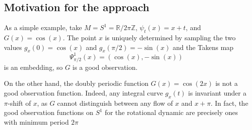 \documentclass[11pt]{article}
\theoremstyle{definition}
\theoremstyle{remark}
\newcommand{\RR}{\mathbb{R}}
\newcommand{\ZZ}{\mathbb{Z}}
\begin{document}
    \subsection{Motivation for the approach}
    As a simple example, take $M=S^1 = \RR/2\pi\ZZ$, $\psi_t(x) = x+t$, and $G(x) = \cos(x)$. The point $x$ is uniquely determined by sampling the two values $g_x(0)=\cos(x)$ and $g_x(\pi/2)= -\sin(x)$ and the Takens map
    \[\Psi_{\pi/2}^1(x) = (\cos(x), -\sin(x)) \]
    is an embedding, so $G$ is a good observation.

    On the other hand, the doubly periodic function $G(x) = \cos(2x)$ is not a good observation function. Indeed, any integral curve $g_x(t)$ is invariant under a $\pi$-shift of $x$, as $G$ cannot distinguish between any flow of $x$ and $x+\pi$. In fact, the good observation functions on $S^1$ for the rotational dynamic are precisely ones with minimum period $2\pi$
\end{document}
